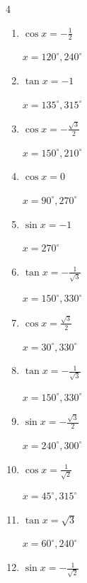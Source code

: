 \begin{multicols}{4}
\begin{enumerate}
  \item $\displaystyle \cos{x}  = -\frac{1}{2}$

        $\displaystyle x = 120^{\circ} , 240^{\circ}$

  \item $\displaystyle \tan{x}  = -1$

        $\displaystyle x = 135^{\circ} , 315^{\circ}$

  \item $\displaystyle \cos{x}  = -\frac{\sqrt{3}}{2}$

        $\displaystyle x = 150^{\circ} , 210^{\circ}$

\columnbreak %

\resetques

  \item $\displaystyle \cos{x}  = 0$

        $\displaystyle x = 90^{\circ} , 270^{\circ}$

  \item $\displaystyle \sin{x}  = -1$

        $\displaystyle x = 270^{\circ}$

  \item $\displaystyle \tan{x}  = -\frac{1}{\sqrt{3}}$

        $\displaystyle x = 150^{\circ} , 330^{\circ}$

  \item $\displaystyle \cos{x}  = \frac{\sqrt{3}}{2}$

        $\displaystyle x = 30^{\circ} , 330^{\circ}$

  \item $\displaystyle \tan{x}  = -\frac{1}{\sqrt{3}}$

        $\displaystyle x = 150^{\circ} , 330^{\circ}$

  \item $\displaystyle \sin{x}  = -\frac{\sqrt{3}}{2}$

        $\displaystyle x = 240^{\circ} , 300^{\circ}$

  \item $\displaystyle \cos{x}  = \frac{1}{\sqrt{2}}$

        $\displaystyle x = 45^{\circ} , 315^{\circ}$

  \item $\displaystyle \tan{x}  = \sqrt{3}$

        $\displaystyle x = 60^{\circ} , 240^{\circ}$

  \item $\displaystyle \sin{x}  = -\frac{1}{\sqrt{2}}$


\end{enumerate}
\end{multicols}
